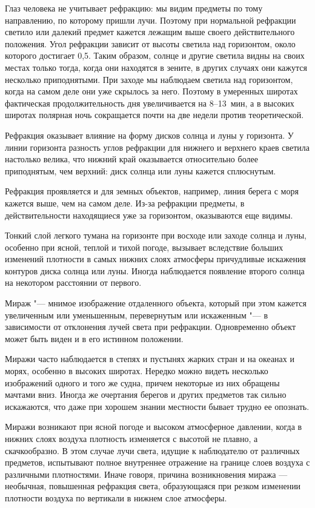 Глаз человека не учитывает рефракцию: мы видим предметы по тому
направлению, по которому пришли лучи. Поэтому при нормальной рефракции
светило или далекий предмет кажется лежащим выше своего
действительного положения. Угол рефракции зависит от высоты светила
над горизонтом, около которого достигает 0,5\gr. Таким образом, солнце и
другие светила видны на своих местах только тогда, когда они находятся
в зените, в других случаях они кажутся несколько приподнятыми. При
заходе мы наблюдаем светила над горизонтом, когда на самом деле они
уже скрылось за него. Поэтому в умеренных широтах фактическая
продолжительность дня увеличивается на 8--13~мин, а в высоких широтах
полярная ночь сокращается почти на две недели против теоретической.

Рефракция оказывает влияние на форму дисков солнца и луны у
горизонта. У линии горизонта разность углов рефракции для нижнего и
верхнего краев светила настолько велика, что нижний край оказывается
относительно более приподнятым, чем верхний: диск солнца или луны
кажется сплюснутым.

Рефракция проявляется и для земных объектов, например, линия берега с
моря кажется выше, чем на самом деле. Из-за рефракции предметы, в
действительности находящиеся уже за горизонтом, оказываются еще
видимы.

Тонкий слой легкого тумана на горизонте при восходе или заходе солнца
и луны, особенно при ясной, теплой и тихой погоде, вызывает вследствие
больших изменений плотности в самых нижних слоях атмосферы причудливые
искажения контуров диска солнца или луны. Иногда наблюдается появление
второго солнца на некотором расстоянии от первого.

Мираж "--- мнимое изображение отдаленного объекта, который при этом
кажется увеличенным или уменьшенным, перевернутым или искаженным "--- в
зависимости от отклонения лучей света при рефракции. Одновременно
объект может быть виден и в его истинном положении.

Миражи часто наблюдается в степях и пустынях жарких стран и на океанах
и морях, особенно в высоких широтах. Нередко можно видеть несколько
изображений одного и того же судна, причем некоторые из них обращены
мачтами вниз. Иногда же очертания берегов и других предметов так
сильно искажаются, что даже при хорошем знании местности бывает трудно
ее опознать.

Миражи возникают при ясной погоде и высоком атмосферное давлении,
когда в нижних слоях воздуха плотность изменяется с высотой не плавно,
а скачкообразно. В этом случае лучи света, идущие к наблюдателю от
различных предметов, испытывают полное внутреннее отражение на границе
слоев воздуха с различными плотностями. Иначе говоря, причина
возникновения миража — необычная, повышенная рефракция света,
образующаяся при резком изменении плотности воздуха по вертикали в
нижнем слое атмосферы.

